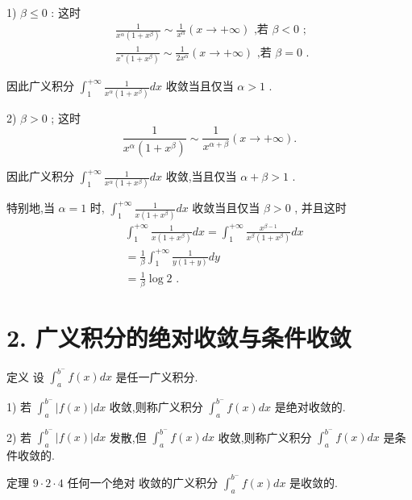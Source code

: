 1) $\beta  \leq  0$ : 这时
\begin{align*}
	&\frac{1}{{x}^{\alpha }\left( {1 + {x}^{\beta }}\right) } \sim  \frac{1}{{x}^{\alpha }}\left( {x \rightarrow   + \infty }\right) \text{ ,若 }\beta  < 0\text{ ; }\\
	&\frac{1}{{x}^{ * }\left( {1 + {x}^{\beta }}\right) } \sim  \frac{1}{2{x}^{\alpha }}\left( {x \rightarrow   + \infty }\right) \text{ ,若 }\beta  = 0\text{ . }
\end{align*}

因此广义积分 ${\int }_{1}^{+\infty }\frac{1}{{x}^{\alpha }\left( {1 + {x}^{\beta }}\right) }{dx}$ 收敛当且仅当 $\alpha  > 1$ .

2) $\beta  > 0$ ; 这时
$$\frac{1}{{x}^{\alpha }\left( {1 + {x}^{\beta }}\right) } \sim  \frac{1}{{x}^{\alpha  + \beta }}\left( {x \rightarrow   + \infty }\right) .$$

因此广义积分 ${\int }_{1}^{+\infty }\frac{1}{{x}^{\alpha }\left( {1 + {x}^{\beta }}\right) }{dx}$ 收敛,当且仅当 $\alpha  + \beta  > 1$ .

特别地,当 $\alpha  = 1$ 时, ${\int }_{1}^{+\infty }\frac{1}{x\left( {1 + {x}^{\beta }}\right) }{dx}$ 收敛当且仅当 $\beta  > 0$ , 并且这时
\begin{align*}
	&{\int }_{1}^{+\infty }\frac{1}{x\left( {1 + {x}^{\beta }}\right) }{dx} = {\int }_{1}^{+\infty }\frac{{x}^{\beta  - 1}}{{x}^{\beta }\left( {1 + {x}^{\beta }}\right) }{dx}\\
	&= \frac{1}{\beta }{\int }_{1}^{+\infty }\frac{1}{y\left( {1 + y}\right) }{dy}\\
	&= \frac{1}{\beta }\log 2\text{ . }
\end{align*}

\section*{2. 广义积分的绝对收敛与条件收敛}

定义 设 ${\int }_{a}^{{b}^{ - }}f\left( x\right) {dx}$ 是任一广义积分.

1) 若 ${\int }_{a}^{{b}^{ - }}\left| {f\left( x\right) }\right| {dx}$ 收敛,则称广义积分 ${\int }_{a}^{{b}^{ - }}f\left( x\right) {dx}$ 是绝对收敛的.

2) 若 ${\int }_{a}^{{b}^{ - }}\left| {f\left( x\right) }\right| {dx}$ 发散,但 ${\int }_{a}^{{b}^{ - }}f\left( x\right) {dx}$ 收敛,则称广义积分 ${\int }_{a}^{{b}^{ - }}f\left( x\right) {dx}$ 是条件收敛的.

定理 $9 \cdot  2 \cdot  4$ 任何一个绝对 收敛的广义积分 ${\int }_{a}^{{b}^{ - }}f\left( x\right) {dx}$ 是收敛的.

